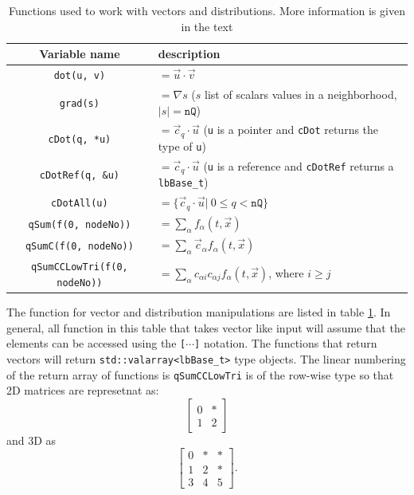 \documentclass[11pt,a4paper]{report}
\begin{document}
\begin{table}
	\centering
	\begin{tabular}{|c|l|}\hline
		Variable name & description \\ \hline
		\texttt{dot(u, v)} & $=\vec{u}\cdot\vec{v}$ \\ 
		\texttt{grad(s)} & $=\nabla s$ ($s$ list of scalars values in a neighborhood, $|s| = \mathtt{nQ}$) \\ \hline
		\texttt{cDot(q, *u)} & $=\vec{c}_q\cdot\vec{u}$ (\texttt{u} is a pointer and \texttt{cDot} returns the type of \texttt{u})\\ 
		\texttt{cDotRef(q, \&u)} & $=\vec{c}_q\cdot\vec{u}$ (\texttt{u} is a reference and \texttt{cDotRef} returns a \texttt{lbBase{\_}t})\\ 
		\texttt{cDotAll(u)} & $=\{\vec{c}_q\cdot\vec{u}|\ 0\leq q < \texttt{nQ}\}$ \\ \hline
		\texttt{qSum(f(0, nodeNo))} & $=\sum_\alpha f_\alpha(t, \vec{x})$ \\
		\texttt{qSumC(f(0, nodeNo))} & $=\sum_\alpha \vec{c}_\alpha f_\alpha(t, \vec{x})$ \\ 
		\texttt{qSumCCLowTri(f(0, nodeNo))} & $=\sum_\alpha c_{\alpha i}c_{\alpha j} f_\alpha(t, \vec{x})$, where $i\geq j$ \\ \hline
	\end{tabular}
	\caption{Functions used to work with vectors and distributions. More information is given in the text}
	\label{tab:vector and distribution functions}
\end{table}
The function for vector and distribution manipulations are listed in table \ref{tab:vector and distribution functions}. In general, all function in this table that takes vector like input will assume that the elements can be accessed using the \texttt{[$\cdots$]} notation. The functions that return vectors will return \texttt{std::valarray<lbBase\_t>} type objects. The linear numbering of the return array of functions is \texttt{qSumCCLowTri} is of the row-wise type so that 2D matrices are represetnat as:
\begin{equation}
\left[\begin{array}{cc}
 0 & * \\
 1 & 2
\end{array}\right]
\end{equation}
and 3D as
\begin{equation}
\left[\begin{array}{ccc}
0 & * & * \\
1 & 2 & * \\
3 & 4 & 5
\end{array}\right].
\end{equation}
\end{document}
